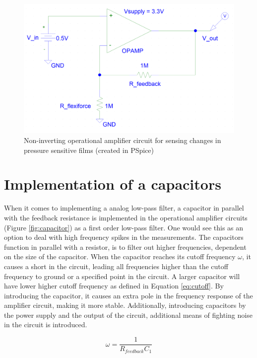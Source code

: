 \begin{figure}
    \centering
    \includegraphics[width=.985\linewidth]{figures/noninverting_opamp.png}
    \caption{Non-inverting operational amplifier circuit for sensing changes in pressure sensitive films (created in PSpice)}
    \label{fig:noninvertingopamp}
\end{figure}

\section{Implementation of a capacitors}
\label{sec:capacitor}
When it comes to implementing a analog low-pass filter, a capacitor in parallel with the feedback resistance is implemented in the operational amplifier circuits (Figure \ref{fig:capacitor}) as a first order low-pass filter. One would see this as an option to deal with high frequency spikes in the measurements. The capacitors function in parallel with a resistor, is to filter out higher frequencies, dependent on the size of the capacitor. When the capacitor reaches its cutoff frequency $\omega$, it causes a short in the circuit, leading all frequencies higher than the cutoff frequency to ground or a specified point in the circuit. A larger capacitor will have lower higher cutoff frequency as defined in Equation \ref{eq:cutoff}. By introducing the capacitor, it causes an extra pole in the frequency response of the amplifier circuit, making it more stable. Additionally, introducing capacitors by the power supply and the output of the circuit, additional means of fighting noise in the circuit is introduced.

\begin{equation}
\label{eq:cutoff}
    \omega = \frac{1}{R_{feedback}C_1}
\end{equation}

